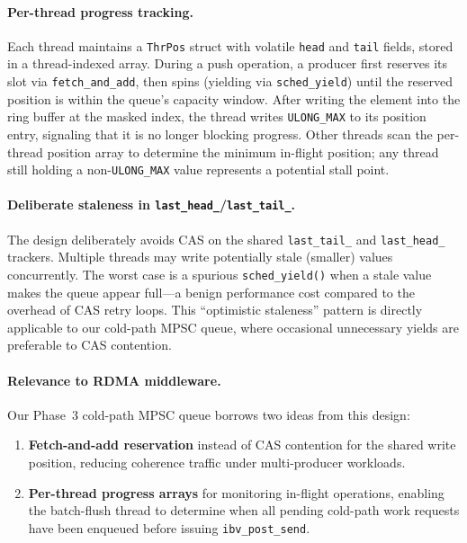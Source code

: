 \documentclass[11pt,letterpaper]{article}
\begin{document}
\paragraph{Per-thread progress tracking.}
Each thread maintains a \texttt{ThrPos} struct with volatile \texttt{head} and \texttt{tail} fields, stored in a thread-indexed array. During a push operation, a producer first reserves its slot via \texttt{fetch\_and\_add}, then spins (yielding via \texttt{sched\_yield}) until the reserved position is within the queue's capacity window. After writing the element into the ring buffer at the masked index, the thread writes \texttt{ULONG\_MAX} to its position entry, signaling that it is no longer blocking progress. Other threads scan the per-thread position array to determine the minimum in-flight position; any thread still holding a non-\texttt{ULONG\_MAX} value represents a potential stall point.

\paragraph{Deliberate staleness in \texttt{last\_head\_}/\texttt{last\_tail\_}.}
The design deliberately avoids CAS on the shared \texttt{last\_tail\_} and \texttt{last\_head\_} trackers. Multiple threads may write potentially stale (smaller) values concurrently. The worst case is a spurious \texttt{sched\_yield()} when a stale value makes the queue appear full---a benign performance cost compared to the overhead of CAS retry loops. This ``optimistic staleness'' pattern is directly applicable to our cold-path MPSC queue, where occasional unnecessary yields are preferable to CAS contention.

\paragraph{Relevance to RDMA middleware.}
Our Phase~3 cold-path MPSC queue borrows two ideas from this design:
\begin{enumerate}
    \item \textbf{Fetch-and-add reservation} instead of CAS contention for the shared write position, reducing coherence traffic under multi-producer workloads.
    \item \textbf{Per-thread progress arrays} for monitoring in-flight operations, enabling the batch-flush thread to determine when all pending cold-path work requests have been enqueued before issuing \texttt{ibv\_post\_send}.
\end{enumerate}
\end{document}
